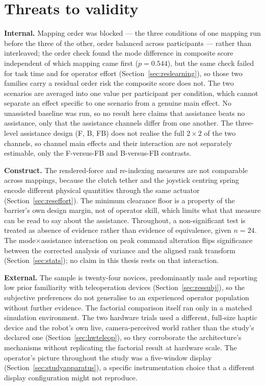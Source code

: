 \documentclass[12pt,a4paper,twoside,openright]{report}
\begin{document}
\section{Threats to validity}
\label{sec:discussion-threats}

\textbf{Internal.} Mapping order was blocked --- the three conditions of one mapping run before the three of the other, order balanced across participants --- rather than interleaved; the order check found the mode difference in composite score independent of which mapping came first ($p = 0.544$), but the same check failed for task time and for operator effort (Section~\ref{sec:reslearning}), so those two families carry a residual order risk the composite score does not. The two scenarios are averaged into one value per participant per condition, which cannot separate an effect specific to one scenario from a genuine main effect. No unassisted baseline was run, so no result here claims that assistance beats no assistance, only that the assistance channels differ from one another. The three-level assistance design (F, B, FB) does not realise the full $2\times2$ of the two channels, so channel main effects and their interaction are not separately estimable, only the F-versus-FB and B-versus-FB contrasts.

\textbf{Construct.} The rendered-force and re-indexing measures are not comparable across mappings, because the clutch tether and the joystick centring spring encode different physical quantities through the same actuator (Section~\ref{sec:reseffort}). The minimum clearance floor is a property of the barrier's own design margin, not of operator skill, which limits what that measure can be read to say about the assistance. Throughout, a non-significant test is treated as absence of evidence rather than evidence of equivalence, given $n=24$. The mode$\times$assistance interaction on peak command alteration flips significance between the corrected analysis of variance and the aligned rank transform (Section~\ref{sec:stats}); no claim in this thesis rests on that interaction.

\textbf{External.} The sample is twenty-four novices, predominantly male and reporting low prior familiarity with teleoperation devices (Section~\ref{sec:ressubj}), so the subjective preferences do not generalise to an experienced operator population without further evidence. The factorial comparison itself ran only in a matched simulation environment. The two hardware trials used a different, full-size haptic device and the robot's own live, camera-perceived world rather than the study's declared one (Section~\ref{sec:hwteleop}), so they corroborate the architecture's mechanisms without replicating the factorial result at hardware scale. The operator's picture throughout the study was a five-window display (Section~\ref{sec:studyapparatus}), a specific instrumentation choice that a different display configuration might not reproduce.
\end{document}
